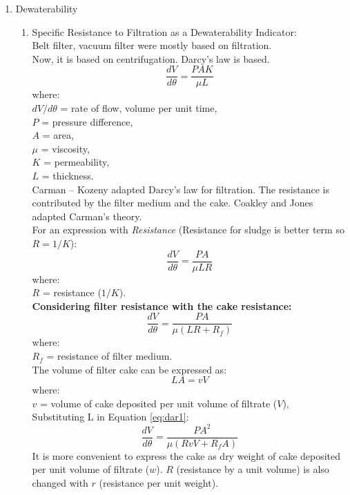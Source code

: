 \documentclass{article}
\numberwithin{equation}{section}
\begin{document}
\begin{enumerate} [start=5]
The particles in the medium increases the viscosity, follows 10\% volume fraction but this is for molecules that don't interact with each other.\\
4 parameters: \emph{shear stress}, \emph{time of measurement}, \emph{temperature}, \emph{solids concentration}.
\item Dewaterability
\begin{enumerate}
    \item Specific Resistance to Filtration as a Dewaterability Indicator:\\
    Belt filter, vacuum filter were mostly based on filtration.\\
    Now, it is based on centrifugation.
    Darcy's law is based.
    \[
    \frac{dV}{d\theta} = \frac{PAK}{\mu L}
    \]
    where:\\
    $dV/d\theta$ = rate of flow, volume per unit time,\\
    $P$ = pressure difference,\\
    $A$ = area,\\
    $\mu$ = viscosity,\\
    $K$ = permeability,\\
    $L$ = thickness.\\
    Carman -- Kozeny adapted Darcy's law for filtration. The resistance is contributed by the filter medium and the cake. Coakley and Jones adapted Carman's theory.\\
    For an expression with \textsl{Resistance}  (Resistance for sludge is better term so $R = 1/K$):
    \[
    \frac{dV}{d\theta} = \frac{PA}{\mu LR}
    \]
    where:\\
    $R$ = resistance ($1/K$).\\
    \textbf{Considering filter resistance with the cake resistance:}
    \begin{equation}
        \frac{dV}{d\theta} = \frac{PA}{\mu (LR+R_f)}
    \label{eq:dar1}
    \end{equation}
    where:\\
    $R_f$ = resistance of filter medium.\\
    The volume of filter cake can be expressed as:
    \[
    LA = vV
    \]
    where:\\
    $v$ = volume of cake deposited per unit volume of filtrate ($V$),\\
    Substituting L in Equation \ref{eq:dar1}:
    \[
    \frac{dV}{d\theta} = \frac{PA^2}{\mu (RvV+R_fA)}
    \]
    It is more convenient to express the cake as dry weight of cake deposited per unit volume of filtrate ($w$). $R$ (resistance by a unit volume) is also changed with $r$ (resistance per unit weight).

\end{enumerate}
\end{enumerate}
\end{document}
